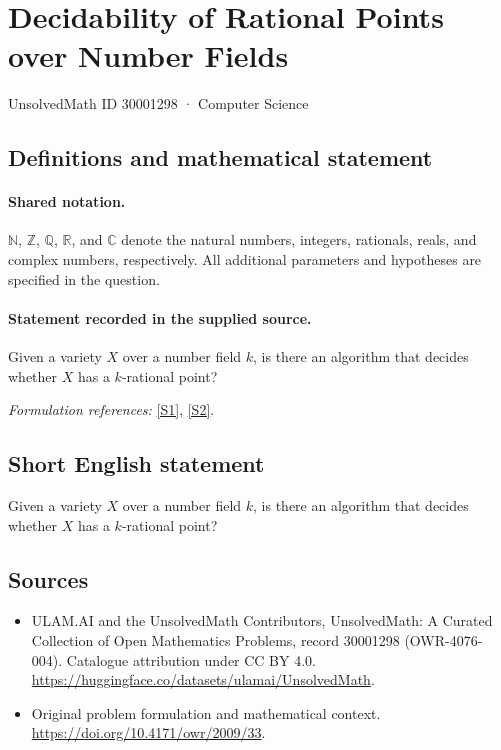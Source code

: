\documentclass[11pt]{article}
\newcommand{\sref}[2]{\hyperlink{source:#1:#2}{[S#2]}}
\begin{document}
\setcounter{section}{30001297}
\section{Decidability of Rational Points over Number Fields}\label{30001298}
{\small UnsolvedMath ID 30001298 · Computer Science}
\subsection{Definitions and mathematical statement}

\paragraph{Shared notation.}$\mathbb N$, $\mathbb Z$, $\mathbb Q$, $\mathbb R$, and $\mathbb C$ denote the natural numbers, integers, rationals, reals, and complex numbers, respectively. All additional parameters and hypotheses are specified in the question.


\paragraph{Statement recorded in the supplied source.}
Given a variety $X$ over a number field $k$, is there an algorithm that decides whether $X$ has a $k$-rational point?
\par\smallskip\textit{Formulation references:} \sref{30001298}{1}, \sref{30001298}{2}.
\subsection{Short English statement}
Given a variety $X$ over a number field $k$, is there an algorithm that decides whether $X$ has a $k$-rational point?
\subsection{Sources}
\begin{itemize}
\item[\hypertarget{source:30001298:1}{S1}] ULAM.AI and the UnsolvedMath Contributors, UnsolvedMath: A Curated Collection of Open Mathematics Problems, record 30001298 (OWR-4076-004). Catalogue attribution under CC BY 4.0.
\url{https://huggingface.co/datasets/ulamai/UnsolvedMath}.
\item[\hypertarget{source:30001298:2}{S2}] Original problem formulation and mathematical context.
\url{https://doi.org/10.4171/owr/2009/33}.
\end{itemize}
\label{end:30001298}
\end{document}
